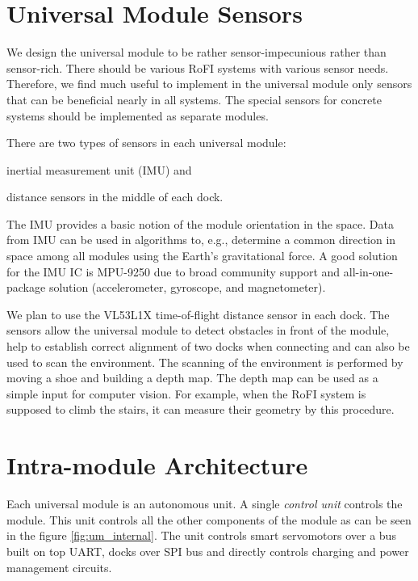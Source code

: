 \section{Universal Module Sensors}

We design the universal module to be rather sensor-impecunious rather than
sensor-rich. There should be various RoFI systems with various sensor needs.
Therefore, we find much useful to implement in the universal module only sensors
that can be beneficial nearly in all systems. The special sensors for concrete
systems should be implemented as separate modules.

There are two types of sensors in each universal module:
\begin{enumerate*}
    \item inertial measurement unit (IMU) and
    \item distance sensors in the middle of each dock.
\end{enumerate*}
The IMU provides a basic notion of the module orientation in the space. Data
from IMU can be used in algorithms to, e.g., determine a common direction in
space among all modules using the Earth's gravitational force. A good solution
for the IMU IC is MPU-9250 \cite{noauthor_mpu-9250_2016} due to broad community
support and all-in-one-package solution (accelerometer, gyroscope, and
magnetometer).

We plan to use the VL53L1X \cite{noauthor_new_2018} time-of-flight distance
sensor in each dock. The sensors allow the universal module to detect obstacles
in front of the module, help to establish correct alignment of two docks when
connecting and can also be used to scan the environment. The scanning of the
environment is performed by moving a shoe and building a depth map. The depth
map can be used as a simple input for computer vision. For example, when the
RoFI system is supposed to climb the stairs, it can measure their geometry by
this procedure.

\section{Intra-module Architecture}

Each universal module is an autonomous unit. A single \emph{control unit}
controls the module. This unit controls all the other components of the module
as can be seen in the figure \ref{fig:um_internal}. The unit controls smart
servomotors over a bus built on top UART, docks over SPI bus and directly
controls charging and power management circuits.

